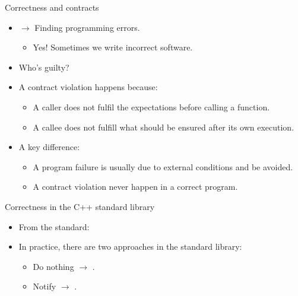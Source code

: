 \begin{frame}[t]{Correctness and contracts}
\begin{itemize}
  \item {} $\rightarrow$ Finding programming errors.
    \begin{itemize}
      \item Yes! Sometimes we write incorrect software.
    \end{itemize}

  \vfill\pause
  \item Who's guilty?
  \item A contract violation happens because:
    \begin{itemize}
      \item A caller does not fulfil the expectations before calling a function.
      \item A callee does not fulfill what should be ensured after its own
execution.
    \end{itemize}
  \vfill\pause
  \item A key difference:
    \begin{itemize}
      \item A program failure is usually due to external conditions and 
be avoided.
      \item A contract violation  never happen in a
correct program.
    \end{itemize}
\end{itemize}
\end{frame}

\begin{frame}[t]{Correctness in the C++ standard library}
\begin{itemize}
  \item From the standard:
\end{itemize}
\vspace{.25ex}
  \vfill\pause
\begin{itemize}
  \item In practice, there are two approaches in the standard library:
    \begin{itemize}
      \item Do nothing $\rightarrow$ .
      \item Notify $\rightarrow$ .
    \end{itemize}
\end{itemize}
\end{frame}
